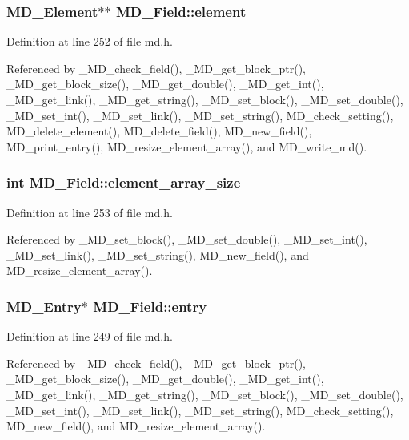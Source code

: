 \subsubsection{\setlength{\rightskip}{0pt plus 5cm}\bf{MD\_\-Element}$\ast$$\ast$ \bf{MD\_\-Field::element}}\label{structMD__Field_30c6e5daf8c090f3d509cf9ab75affd6}




Definition at line 252 of file md.h.

Referenced by \_\-MD\_\-check\_\-field(), \_\-MD\_\-get\_\-block\_\-ptr(), \_\-MD\_\-get\_\-block\_\-size(), \_\-MD\_\-get\_\-double(), \_\-MD\_\-get\_\-int(), \_\-MD\_\-get\_\-link(), \_\-MD\_\-get\_\-string(), \_\-MD\_\-set\_\-block(), \_\-MD\_\-set\_\-double(), \_\-MD\_\-set\_\-int(), \_\-MD\_\-set\_\-link(), \_\-MD\_\-set\_\-string(), MD\_\-check\_\-setting(), MD\_\-delete\_\-element(), MD\_\-delete\_\-field(), MD\_\-new\_\-field(), MD\_\-print\_\-entry(), MD\_\-resize\_\-element\_\-array(), and MD\_\-write\_\-md().
\subsubsection{\setlength{\rightskip}{0pt plus 5cm}int \bf{MD\_\-Field::element\_\-array\_\-size}}\label{structMD__Field_95585076fd05168f68462f2c01eadaa3}




Definition at line 253 of file md.h.

Referenced by \_\-MD\_\-set\_\-block(), \_\-MD\_\-set\_\-double(), \_\-MD\_\-set\_\-int(), \_\-MD\_\-set\_\-link(), \_\-MD\_\-set\_\-string(), MD\_\-new\_\-field(), and MD\_\-resize\_\-element\_\-array().
\subsubsection{\setlength{\rightskip}{0pt plus 5cm}\bf{MD\_\-Entry}$\ast$ \bf{MD\_\-Field::entry}}\label{structMD__Field_488f279bdde7f11a63d112a52390d726}




Definition at line 249 of file md.h.

Referenced by \_\-MD\_\-check\_\-field(), \_\-MD\_\-get\_\-block\_\-ptr(), \_\-MD\_\-get\_\-block\_\-size(), \_\-MD\_\-get\_\-double(), \_\-MD\_\-get\_\-int(), \_\-MD\_\-get\_\-link(), \_\-MD\_\-get\_\-string(), \_\-MD\_\-set\_\-block(), \_\-MD\_\-set\_\-double(), \_\-MD\_\-set\_\-int(), \_\-MD\_\-set\_\-link(), \_\-MD\_\-set\_\-string(), MD\_\-check\_\-setting(), MD\_\-new\_\-field(), and MD\_\-resize\_\-element\_\-array().

